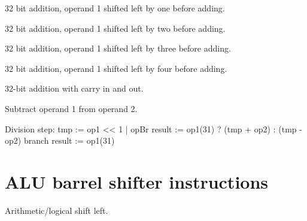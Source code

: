 32 bit addition, operand 1 shifted left by one before adding.

32 bit addition, operand 1 shifted left by two before adding.

32 bit addition, operand 1 shifted left by three before adding.

32 bit addition, operand 1 shifted left by four before adding.

32-bit addition with carry in and out.

Subtract operand 1 from operand 2.

Division step:
  tmp := op1 << 1 | opBr
  result := op1(31) ? (tmp + op2) : (tmp - op2)
  branch result := op1(31)

\section{ALU barrel shifter instructions}

Arithmetic/logical shift left.


